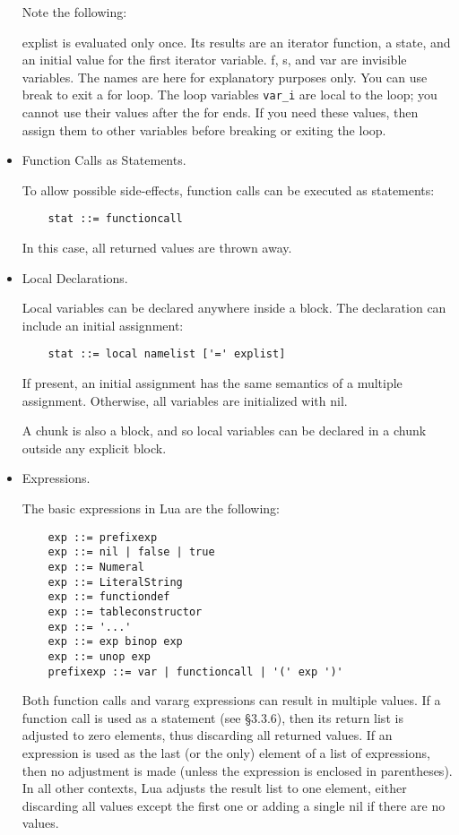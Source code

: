 \begin{itemize}
Note the following:

    explist is evaluated only once. Its results are an iterator function, a state, and an initial value for the first iterator variable.
    f, s, and var are invisible variables. The names are here for explanatory purposes only.
    You can use break to exit a for loop.
    The loop variables \verb=var_i= are local to the loop; you cannot use their values after the for ends. If you need these values, then assign them to other variables before breaking or exiting the loop.

\item Function Calls as Statements.

To allow possible side-effects, function calls can be executed as statements:
\begin{lstlisting}
	stat ::= functioncall
\end{lstlisting}
In this case, all returned values are thrown away.

\item Local Declarations.

Local variables can be declared anywhere inside a block. The declaration can include an initial assignment:
\begin{lstlisting}
	stat ::= local namelist ['=' explist]
\end{lstlisting}
If present, an initial assignment has the same semantics of a multiple assignment. Otherwise, all variables are initialized with nil.

A chunk is also a block, and so local variables can be declared in a chunk outside any explicit block.


\item Expressions.

The basic expressions in Lua are the following:
\begin{lstlisting}
	exp ::= prefixexp
	exp ::= nil | false | true
	exp ::= Numeral
	exp ::= LiteralString
	exp ::= functiondef
	exp ::= tableconstructor
	exp ::= '...'
	exp ::= exp binop exp
	exp ::= unop exp
	prefixexp ::= var | functioncall | '(' exp ')'
\end{lstlisting}

Both function calls and vararg expressions can result in multiple values. If a function call is used as a statement (see §3.3.6), then its return list is adjusted to zero elements, thus discarding all returned values. If an expression is used as the last (or the only) element of a list of expressions, then no adjustment is made (unless the expression is enclosed in parentheses). In all other contexts, Lua adjusts the result list to one element, either discarding all values except the first one or adding a single nil if there are no values.


\end{itemize}
